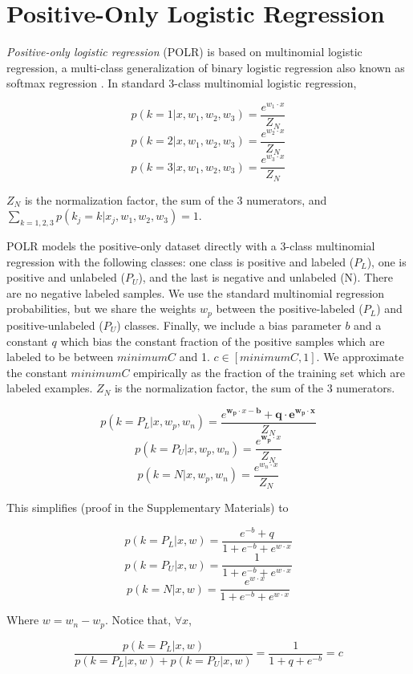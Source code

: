 \documentclass{article}
\begin{document}
\section{Positive-Only Logistic Regression}

\emph{Positive-only logistic regression} (POLR) is based on multinomial logistic regression, a multi-class generalization of binary logistic regression also known as softmax regression \cite{renie05}.  In standard 3-class multinomial logistic regression,

$$p(k=1 | x, w_1, w_2, w_3) =  \frac{e^{w_1 \cdot x}}{Z_N}$$
$$p(k=2 | x, w_1, w_2, w_3) =  \frac{e^{w_2 \cdot x}}{Z_N}$$
$$p(k=3 | x, w_1, w_2, w_3) =  \frac{e^{w_3 \cdot x}}{Z_N}$$

$Z_N$ is the normalization factor, the sum of the 3 numerators, and $\sum_{k=1,2,3}{p(k_j=k|x_j, w_1, w_2, w_3)} = 1$.

POLR models the positive-only dataset directly with a 3-class multinomial regression with the following classes: one class is positive and labeled ($P_L$), one is positive and unlabeled ($P_U$), and the last is negative and unlabeled (N).  There are no negative labeled samples.  We use the standard multinomial regression probabilities, but we share the weights $w_p$ between the positive-labeled ($P_L$) and positive-unlabeled ($P_U$) classes. Finally, we include a bias parameter $b$ and a constant $q$ which bias the constant fraction of the positive samples which are labeled to be between $minimumC$ and 1. $c \in [minimumC, 1]$.  We approximate the constant $minimumC$ empirically as the fraction of the training set which are labeled examples.  $Z_N$ is the normalization factor, the sum of the 3 numerators.

$$p(k=P_L | x, w_p, w_n) =  \frac{e^{\mathbf{w_p} \cdot x - \mathbf{b}} + \mathbf{q \cdot e^{w_p \cdot x}}}{Z_N}$$
$$p(k=P_U | x, w_p, w_n) =  \frac{e^{\mathbf{w_p} \cdot x}}{Z_N}$$
$$p(k=N | x, w_p, w_n) =  \frac{e^{w_n \cdot x}}{Z_N}$$

This simplifies (proof in the Supplementary Materials) to

$$ p(k=P_L | x, w) = \frac{e^{-b} + q}{1 + e^{-b} + e^{w \cdot x}}$$
$$ p(k=P_U | x, w) =  \frac{1}{1 + e^{-b} + e^{w \cdot x}}$$
$$ p(k=N | x, w) = \frac{e^{w \cdot x}}{1 + e^{-b} + e^{w \cdot x}}$$

Where $w = w_n - w_p$. Notice that, $\forall x$,

$$\frac{p(k=P_L | x, w)}{p(k=P_L | x, w) + p(k=P_U | x, w)} = \frac{1}{1 + q + e^{-b}} = c$$
\end{document}
